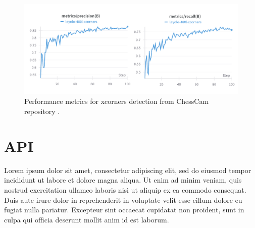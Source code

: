 \begin{figure}[H]
\centering
\includegraphics[width=\textwidth]{figures/results/machine-learning/xcorners-metrics.png}
\caption{Performance metrics for xcorners detection from ChessCam repository \cite{wandb:xcorner-detection}.}
\label{fig:chesscam-xcorners-metrics}
\end{figure}

\section{API}



Lorem ipsum dolor sit amet, consectetur adipiscing elit, sed do eiusmod tempor incididunt ut labore et dolore magna aliqua. Ut enim ad minim veniam, quis nostrud exercitation ullamco laboris nisi ut aliquip ex ea commodo consequat. Duis aute irure dolor in reprehenderit in voluptate velit esse cillum dolore eu fugiat nulla pariatur. Excepteur sint occaecat cupidatat non proident, sunt in culpa qui officia deserunt mollit anim id est laborum. \\

